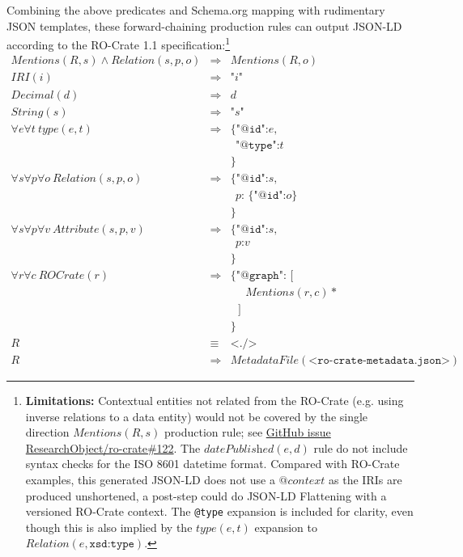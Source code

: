 \documentclass[ds,v1.1.2,openaccess]{iosart2x}%
\begin{document}
\begin{appendix}
Combining the above predicates and Schema.org mapping with rudimentary
JSON templates, these forward-chaining production rules can output
JSON-LD according to the RO-Crate 1.1 specification:\footnote{\textbf{Limitations:}
 Contextual entities not related from the
RO-Crate (e.g. using inverse relations to a data entity) would not be
covered by the single direction $Mentions(R, s)$ production rule; see
\href{https://github.com/ResearchObject/ro-crate/issues/122}{GitHub
issue ResearchObject/ro-crate\#122}. The $\textit{datePublished}(e, d)$ rule do
not include syntax checks for the ISO 8601 datetime format. Compared
with RO-Crate examples, this generated JSON-LD does not use a
$\textit{@context}$ as the IRIs are produced unshortened, a post-step could do
JSON-LD Flattening with a versioned RO-Crate context. The \texttt
{@type} expansion is included for clarity, even though this is also
implied by the $\textit{type}(e, t)$ expansion to $\textit{Relation}(e, \texttt{xsd:type})$.}
%
\begin{eqnarray*}
\textit{Mentions}(R, s) \land \textit{Relation}(s,p,o) & \Rightarrow&
\textit{Mentions}(R, o)
\\
\textit{IRI}(i) & \Rightarrow& \texttt{"} i \texttt{"}
\\
\textit{Decimal}(d) & \Rightarrow& d
\\
\textit{String}(s) & \Rightarrow& \texttt{"} s \texttt{"}
\\
\forall e \forall t \ \textit{type}(e, t) & \Rightarrow& \texttt{\{"@id":} e
\texttt{,}
\\
&& \ \ \texttt{"@type":} t
\\
&& \texttt{\}}
\\
\forall s \forall p \forall o \ \textit{Relation}(s,p,o) & \Rightarrow& 
\texttt{\{"@id":} s \texttt{,}
\\
&& \ \ p \texttt{: \{"@id":} o \texttt{\}}
\\
&& \texttt{\}}
\\
\forall s \forall p \forall v \ \textit{Attribute}(s,p,v) & \Rightarrow&
\texttt{\{"@id":} s \texttt{,}
\\
&& \ \ p \texttt{:} v
\\
&& \texttt{\}}
\\
\forall r \forall c\ \textit{ROCrate}(r) & \Rightarrow& 
\texttt{\{"@graph": [}
\\
&& \ \ \ \ \ \ \textit{Mentions}(r, c)*
\\
&& \ \ \ \texttt{]}
\\
&& \texttt{\}}
\\
R & \equiv& \texttt{<./>}
\\
R & \Rightarrow& \textit{MetadataFile}(\texttt{<ro-crate-metadata.json>})
\end{eqnarray*}


\end{appendix}
\end{document}

